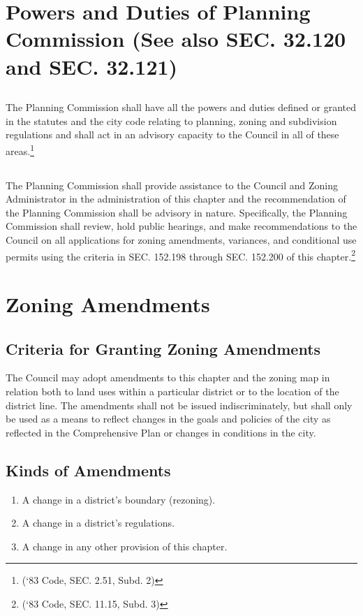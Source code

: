 \section{Powers and Duties of Planning Commission (See also SEC. 32.120 and SEC. 32.121)}
\subsection{}
The Planning Commission shall have all the powers and duties defined or granted in the statutes and the city code relating to planning, zoning and subdivision regulations and shall act in an advisory capacity to the Council in all of these areas.\footnote{(‘83 Code, SEC. 2.51, Subd. 2)}
\subsection{}
The Planning Commission shall provide assistance to the Council and Zoning Administrator in the administration of this chapter and the recommendation of the Planning Commission shall be advisory in nature. Specifically, the Planning Commission shall review, hold public hearings, and make recommendations to the Council on all applications for zoning amendments, variances, and conditional use permits using the criteria in SEC. 152.198 through SEC. 152.200 of this chapter.\footnote{(‘83 Code, SEC. 11.15, Subd. 3)}
\section{Zoning Amendments}
\subsection{Criteria for Granting Zoning Amendments}
The Council may adopt amendments to this chapter and the zoning map in relation both to land uses within a particular district or to the location of the district line. The amendments shall not be issued indiscriminately, but shall only be used as a means to reflect changes in the goals and policies of the city as reflected in the Comprehensive Plan or changes in conditions in the city.
\subsection{Kinds of Amendments}
\begin{enumerate}[{\indent}1)]
    \item A change in a district’s boundary (rezoning).
    \item A change in a district’s regulations.
    \item A change in any other provision of this chapter.
\end{enumerate}
